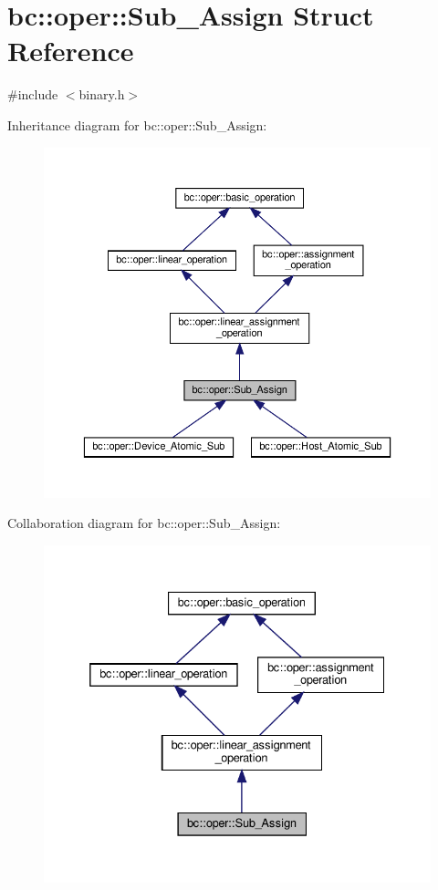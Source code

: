 \hypertarget{structbc_1_1oper_1_1Sub__Assign}{}\section{bc\+:\+:oper\+:\+:Sub\+\_\+\+Assign Struct Reference}
\label{structbc_1_1oper_1_1Sub__Assign}


{\ttfamily \#include $<$binary.\+h$>$}



Inheritance diagram for bc\+:\+:oper\+:\+:Sub\+\_\+\+Assign\+:\nopagebreak
\begin{figure}[H]
\begin{center}
\leavevmode
\includegraphics[width=350pt]{structbc_1_1oper_1_1Sub__Assign__inherit__graph}
\end{center}
\end{figure}


Collaboration diagram for bc\+:\+:oper\+:\+:Sub\+\_\+\+Assign\+:\nopagebreak
\begin{figure}[H]
\begin{center}
\leavevmode
\includegraphics[width=332pt]{structbc_1_1oper_1_1Sub__Assign__coll__graph}
\end{center}
\end{figure}
